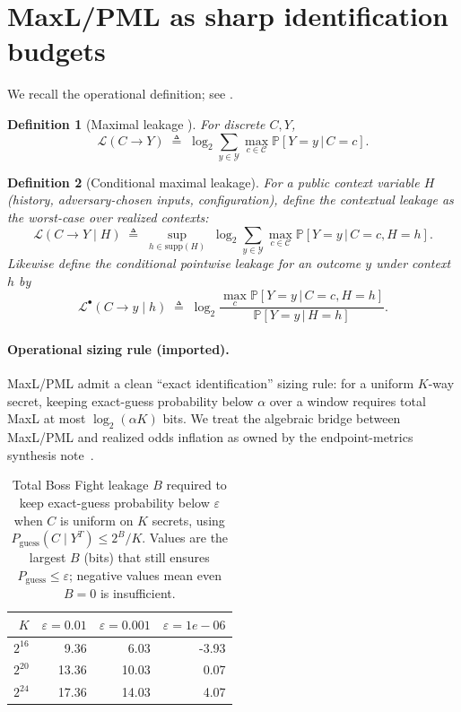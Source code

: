 \documentclass[11pt]{article}
\newcommand{\Prb}{\mathbb{P}}
\newcommand{\supp}{\mathrm{supp}}
\newcommand{\MaxL}{\mathcal{L}}
\newcommand{\PML}{\mathcal{L}^{\bullet}}
\newcommand{\given}{\,|\,}
\newcommand{\logtwo}{\log_2}
\newcommand{\C}{\mathcal{C}} %
\newcommand{\Y}{\mathcal{Y}} %
\newtheorem{definition}{Definition}
\begin{document}
\section{MaxL/PML as sharp identification budgets}\label{sec:maxl}
We recall the operational definition; see \cite{issa2020operational}.

\begin{definition}[Maximal leakage \cite{issa2020operational}]
For discrete $C,Y$,
\[
\MaxL(C\!\to\!Y)\;\triangleq\;\logtwo\sum_{y\in\Y}\max_{c\in\C}\Prb[Y=y\given C=c].
\]
\end{definition}


\begin{definition}[Conditional maximal leakage]\label{def:condmaxl}
For a public context variable $H$ (history, adversary-chosen inputs, configuration), define the \emph{contextual} leakage as the worst-case over realized contexts:
\[
\MaxL(C\!\to\!Y\mid H)\;\triangleq\;\sup_{h\in\supp(H)}\;\logtwo\sum_{y\in\Y}\max_{c\in\C}\Prb[Y=y\given C=c,H=h].
\]
Likewise define the conditional pointwise leakage for an outcome $y$ under context $h$ by
\[
\PML(C\!\to\!y\mid h)\;\triangleq\;\logtwo\frac{\max_{c}\Prb[Y=y\given C=c,H=h]}{\Prb[Y=y\given H=h]}.
\]
\end{definition}
\paragraph{Operational sizing rule (imported).}
MaxL/PML admit a clean ``exact identification'' sizing rule: for a uniform $K$-way secret, keeping exact-guess probability below $\alpha$ over a window requires total MaxL at most $\log_2(\alpha K)$ bits.
We treat the algebraic bridge between MaxL/PML and realized odds inflation as owned by the endpoint-metrics synthesis note~\cite{series:endpointbridge}.

\begin{table}[t]
\centering
\caption{Total Boss Fight leakage $B$ required to keep exact-guess probability below $\varepsilon$ when $C$ is uniform on $K$ secrets, using $P_{\mathrm{guess}}(C\mid Y^{T})\le 2^{B}/K$. Values are the largest $B$ (bits) that still ensures $P_{\mathrm{guess}}\le \varepsilon$; negative values mean even $B=0$ is insufficient.}
\label{tab:identification-targets}
\begin{tabular}{r r r r}
\toprule
$K$ & $\varepsilon=0.01$ & $\varepsilon=0.001$ & $\varepsilon=1e-06$\\
\midrule
$2^{16}$ & 9.36 & 6.03 & -3.93 \\
$2^{20}$ & 13.36 & 10.03 & 0.07 \\
$2^{24}$ & 17.36 & 14.03 & 4.07 \\
\bottomrule
\end{tabular}
\end{table}
\end{document}
